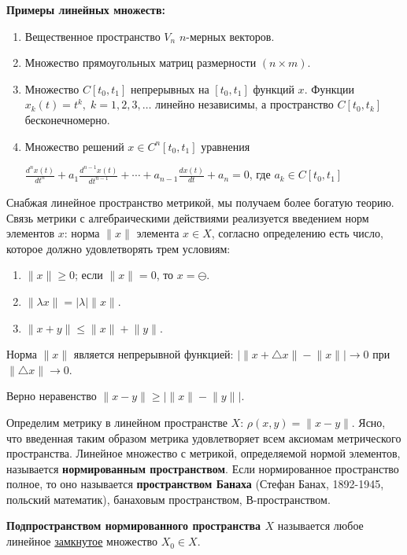 \documentclass[12pt,a4paper,titlepage]{book}
\theoremstyle{definition}
\theoremstyle{plain}
\theoremstyle{remark}
\theoremstyle{plain}
\begin{document}
\textbf{Примеры линейных множеств:}
\begin{enumerate}
\item Вещественное пространство $V_n$ $n$-мерных векторов.
\item Множество прямоугольных матриц размерности $(n\times m)$.
\item Множество $C[t_0,t_1]$ непрерывных на $[t_0,t_1]$ функций $x$. Функции $x_k(t)=t^k,\; k=1,2,3,\dotsc$ линейно независимы, а пространство $C[t_0,t_k]$ бесконечномерно.
\item Множество решений $x\in C^n[t_0,t_1]$ уравнения
\begin{center}
$\frac{d^nx(t)}{dt^n}+a_1\frac{d^{n-1}x(t)}{dt^{n-1}}+\dotsb+a_{n-1}\frac{dx(t)}{dt}+a_n=0$, где $a_k\in C[t_0,t_1]$
\end{center}
\end{enumerate}
\par Снабжая линейное пространство метрикой, мы получаем более богатую теорию. Связь метрики с алгебраическими действиями реализуется введением норм элементов $x$: норма $\lVert x\rVert$ элемента $x\in X$, согласно определению есть число, которое должно удовлетворять трем условиям:
\begin{enumerate}
\item $\lVert x\rVert \geq 0$; если $\lVert x\rVert = 0$, то $x=\ominus$.
\item $\lVert \lambda x \rVert = \lvert \lambda \rvert \lVert x \rVert$.
\item $\lVert x+y \rVert\leq\lVert x \rVert + \lVert y \rVert$.
\end{enumerate}
\par Норма $\lVert x\rVert$ является непрерывной функцией: $\lvert\lVert x+\triangle x\rVert-\lVert x\rVert\rvert\to0$ при $\lVert\triangle x\rVert\to0$.
\par Верно неравенство $\lVert x-y\rVert\geq\lvert\lVert x\rVert-\lVert y\rVert\rvert$.
\par Определим метрику в линейном пространстве $X$: $\rho(x,y)=\lVert x-y\rVert$. Ясно, что введенная таким образом метрика удовлетворяет всем аксиомам метрического пространства. Линейное множество с метрикой, определяемой нормой элементов, называется \textbf{нормированным пространством}. Если нормированное пространство полное, то оно называется \textbf{пространством Банаха} (Стефан Банах, 1892-1945, польский математик), банаховым пространством, В-пространством.
\par \textbf{Подпространством нормированного пространства $X$} называется любое линейное \underline{замкнутое} множество $X_0 \in X$.
\end{document}
